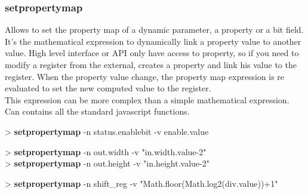 \documentclass[10pt,a4paper]{article}
\begin{document}
{\subsubsection{setpropertymap}

Allows to set the property map of a dynamic parameter, a property or a bit field. It's the mathematical expression to dynamically link a property value to another value. High level interface or API only have access to property, so if you need to modify a register from the external, creates a property and link his value to the register. When the property value change, the property map expression is re evaluated to set the new computed value to the register.\\

This expression can be more complex than a simple mathematical expression. Can contains all the standard javascript functions.\\


\begin{sampletitle}[1]
> \textbf{\tool{} setpropertymap} -n status.enablebit -v enable.value
\end{sampletitle}

\begin{sampletitle}[2]
> \textbf{\tool{} setpropertymap} -n out.width -v "in.width.value-2" \\
> \textbf{\tool{} setpropertymap} -n out.height -v "in.height.value-2"
\end{sampletitle}

\begin{sampletitle}[3]
> \textbf{\tool{} setpropertymap} -n shift\_reg -v "Math.floor(Math.log2(div.value))+1"
\end{sampletitle}

}
\end{document}
